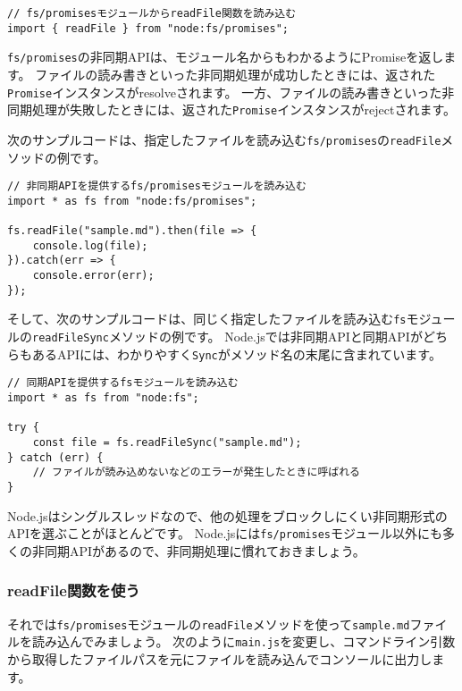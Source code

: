 \begin{lstlisting}
// fs/promisesモジュールからreadFile関数を読み込む
import { readFile } from "node:fs/promises";
\end{lstlisting}

\texttt{fs/promises}の非同期APIは、モジュール名からもわかるようにPromiseを返します。
ファイルの読み書きといった非同期処理が成功したときには、返された\texttt{Promise}インスタンスがresolveされます。
一方、ファイルの読み書きといった非同期処理が失敗したときには、返された\texttt{Promise}インスタンスがrejectされます。

次のサンプルコードは、指定したファイルを読み込む\texttt{fs/promises}の\texttt{readFile}メソッドの例です。

\begin{lstlisting}
// 非同期APIを提供するfs/promisesモジュールを読み込む
import * as fs from "node:fs/promises";

fs.readFile("sample.md").then(file => {
    console.log(file);
}).catch(err => {
    console.error(err);
});
\end{lstlisting}
\vspace{-2mm}
そして、次のサンプルコードは、同じく指定したファイルを読み込む\texttt{fs}モジュールの\texttt{readFileSync}メソッドの例です。
Node.jsでは非同期APIと同期APIがどちらもあるAPIには、わかりやすく\texttt{Sync}がメソッド名の末尾に含まれています。
\vspace{-2mm}
\begin{lstlisting}
// 同期APIを提供するfsモジュールを読み込む
import * as fs from "node:fs";

try {
    const file = fs.readFileSync("sample.md");
} catch (err) {
    // ファイルが読み込めないなどのエラーが発生したときに呼ばれる
}
\end{lstlisting}
\vspace{-2mm}
Node.jsはシングルスレッドなので、他の処理をブロックしにくい非同期形式のAPIを選ぶことがほとんどです。
Node.jsには\texttt{fs/promises}モジュール以外にも多くの非同期APIがあるので、非同期処理に慣れておきましょう。
\vspace{-2mm}
\hypertarget{use-readFile}{%
\subsubsection{readFile関数を使う}\label{use-readFile}}

それでは\texttt{fs/promises}モジュールの\texttt{readFile}メソッドを使って\texttt{sample.md}ファイルを読み込んでみましょう。
次のように\texttt{main.js}を変更し、コマンドライン引数から取得したファイルパスを元にファイルを読み込んでコンソールに出力します。
\vspace{-2mm}


